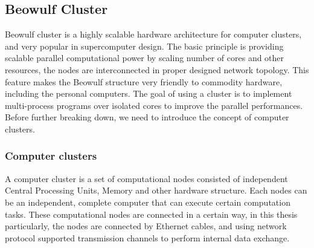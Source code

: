 \documentclass[11pt,openright,a4paper]{report}
\begin{document}
\subsection{Beowulf Cluster}
Beowulf cluster is a highly scalable hardware architecture for computer clusters, and very popular in supercomputer design\cite{behrooz2005computer}. The basic principle is providing scalable parallel computational power by scaling number of cores and other resources, the nodes are interconnected in proper designed network topology. This feature makes the Beowulf structure very friendly to commodity hardware, including the personal computers\cite{sterling2002beowulf}. The goal of using a cluster is to implement multi-process programs over isolated cores to improve the parallel performances. Before further breaking down, we need to introduce the concept of computer clusters.\\
\subsubsection{Computer clusters}
A computer cluster is a set of computational nodes consisted of independent Central Processing Units, Memory and other hardware structure\cite{vrenios2002linux}. Each nodes can be an independent, complete computer that can execute certain computation tasks\cite{sterling2002beowulf}. These computational nodes are connected in a certain way, in this thesis particularly, the nodes are connected by Ethernet cables, and using network protocol supported transmission channels to perform internal data exchange. \\
\end{document}
